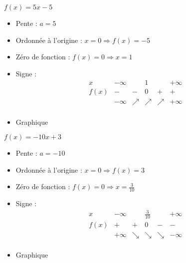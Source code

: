 \begin{solution}
$f(x)=5x-5$
\begin{itemize}
\item Pente :	$a=5$
\item Ordonnée à l’origine :	$x=0\Rightarrow f(x)=-5$ 
\item Zéro de fonction :	$f(x)=0\Rightarrow x=1$
\item Signe :
$$\begin{array}{l|l|l|l|l|l}
x    & -\infty &   & 1 &   & +\infty \\
\hline
f(x) & -       & - & 0  & + & +   \\
 & -\infty & \nearrow & \nearrow & \nearrow & +\infty \\   
\end{array}$$
\item Graphique
\end{itemize}
\end{solution}

\begin{solution}
$f(x)=-10x+3$
\begin{itemize}
\item Pente :	$a=-10$
\item Ordonnée à l’origine :	$x=0\Rightarrow f(x)=3$
\item Zéro de fonction :	$f(x)=0\Rightarrow x=\frac{3}{10}$
\item Signe :	
$$\begin{array}{l|l|l|l|l|l}
x    & -\infty &   & \frac{3}{10} &   & +\infty \\
\hline
f(x) & +       & + & 0  & - & -   \\
 & +\infty & \searrow & \searrow & \searrow & -\infty \\   
\end{array}$$
\item Graphique
\end{itemize}
\end{solution}


